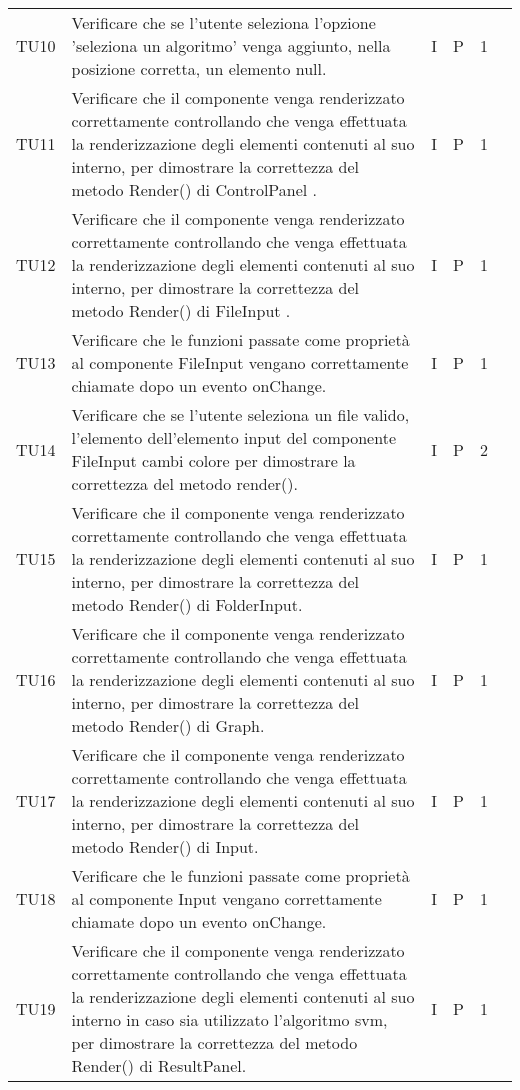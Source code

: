 \begin{longtable} {
		>{}p{12mm}
		>{}p{79.5mm}
		>{}p{9mm}
		>{}p{8mm}
		>{}p{14mm}
		>{}p{0mm}}
	TU10		& Verificare che se l'utente seleziona l'opzione 'seleziona un algoritmo' venga aggiunto, nella posizione corretta, un elemento null. & I & P & 1 & \TBstrut \\ [2mm]
	TU11		& Verificare che il componente venga renderizzato correttamente controllando che venga effettuata la renderizzazione degli elementi contenuti al suo interno, per dimostrare la correttezza del metodo Render() di  ControlPanel . & I & P & 1 & \TBstrut \\ [2mm]
	TU12		& Verificare che il componente venga renderizzato correttamente controllando che venga effettuata la renderizzazione degli elementi contenuti al suo interno, per dimostrare la correttezza del metodo Render() di FileInput . & I & P & 1 & \TBstrut \\ [2mm]
	TU13		& Verificare che le funzioni passate come proprietà al componente FileInput vengano correttamente chiamate dopo un evento onChange. & I & P & 1 & \TBstrut \\ [2mm]
	TU14		& Verificare che se l'utente seleziona un file valido, l'elemento dell'elemento input del componente FileInput cambi colore per dimostrare la correttezza del metodo render(). & I & P & 2 & \TBstrut \\ [2mm]
	TU15		& Verificare che il componente venga renderizzato correttamente controllando che venga effettuata la renderizzazione degli elementi contenuti al suo interno, per dimostrare la correttezza del metodo Render() di  FolderInput. & I & P & 1 & \TBstrut \\ [2mm]
	TU16		& Verificare che il componente venga renderizzato correttamente controllando che venga effettuata la renderizzazione degli elementi contenuti al suo interno, per dimostrare la correttezza del metodo Render() di  Graph. & I & P & 1 & \TBstrut \\ [2mm]
	TU17		& Verificare che il componente venga renderizzato correttamente controllando che venga effettuata la renderizzazione degli elementi contenuti al suo interno, per dimostrare la correttezza del metodo Render() di  Input. & I & P & 1 & \TBstrut \\ [2mm]
	TU18		& Verificare che le funzioni passate come proprietà al componente Input vengano correttamente chiamate dopo un evento onChange. & I & P & 1 & \TBstrut \\ [2mm]
	TU19		& Verificare che il componente venga renderizzato correttamente controllando che venga effettuata la renderizzazione degli elementi contenuti al suo interno in caso sia utilizzato l'algoritmo svm, per dimostrare la correttezza del metodo Render() di ResultPanel. & I & P & 1 & \TBstrut \\ [2mm]

\end{longtable}
